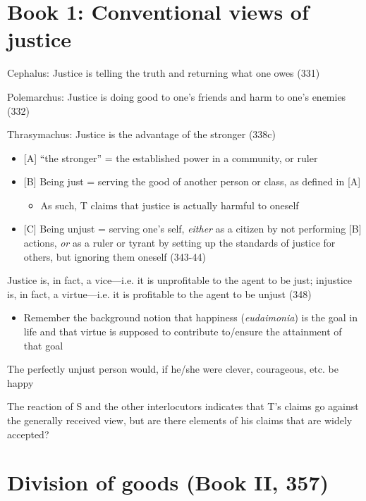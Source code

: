 \documentclass[11pt]{article}
\begin{document}
\section*{Book 1: Conventional views of justice}

\noindent Cephalus: Justice is telling the truth and returning what one owes (331)
\vspace*{2mm}

\noindent Polemarchus: Justice is doing good to one's friends and harm to one's enemies (332)
\vspace*{2mm}

\noindent Thrasymachus: Justice is the advantage of the stronger (338c)
\begin{itemize}\item{[A] ``the stronger'' = the established power in a community, or ruler}\item{[B] Being just = serving the good of another person or class, as defined in [A]}\begin{itemize}\item{As such, T claims that justice is actually harmful to oneself}\end{itemize}\item{[C] Being unjust = serving one's self, \emph{either} as a citizen by not performing [B] actions, \emph{or} as a ruler or tyrant by setting up the standards of justice for others, but ignoring them oneself (343-44)}\end{itemize}

\noindent Justice is, in fact, a vice---i.e. it is unprofitable to the agent to be just; injustice is, in fact, a virtue---i.e. it is profitable to the agent to be unjust (348)

\begin{itemize}\item{Remember the background notion that happiness (\emph{eudaimonia}) is the goal in life and that virtue is supposed to contribute to/ensure the attainment of that goal}\end{itemize}

\noindent The perfectly unjust person would, if he/she were clever, courageous, etc. be happy
\vspace*{2mm}

\noindent The reaction of S and the other interlocutors indicates that T's claims go against the generally received view, but are there elements of his claims that are widely accepted?

\section*{Division of goods (Book II, 357)}
\end{document}
